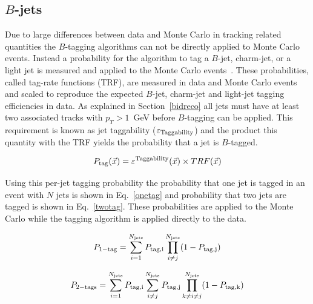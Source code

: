 \subsection{$B$-jets}

Due to large differences between data and Monte Carlo in tracking related quantities the $B$-tagging algorithms can not be directly applied to Monte Carlo events. Instead a probability for the algorithm to tag a $B$-jet, charm-jet, or a light jet is measured and applied to the Monte Carlo events~\cite{bid}. These probabilities, called tag-rate functions (TRF), are measured in data and Monte Carlo events and scaled to reproduce the expected $B$-jet, charm-jet and light-jet tagging efficiencies in data. As explained in Section~\ref{bidreco} all jets must have at least two associated tracks with $p_{T}>1$~GeV before $B$-tagging can be applied. This requirement is known as jet taggability ($\varepsilon_{\rm{Taggability}}$) and the product this quantity with the TRF yields the probability that a jet is $B$-tagged.

\begin{equation}
P_{\rm{tag}}(\vec{x}) = \varepsilon^{\rm{Taggability}}(\vec{x}) \times TRF(\vec{x})
\end{equation}

Using this per-jet tagging probability the probability that one jet is tagged in an event with $N$ jets is shown in Eq.~\ref{onetag} and probability that two jets are tagged is shown in Eq.~\ref{twotag}. These probabilities are applied to the Monte Carlo while the tagging algorithm is applied directly to the data.

\begin{equation}
\label{onetag}
P_{\rm{1-tag}} = \sum_{i=1}^{N_{\rm{jets}}} P_{\rm{tag},i} \prod_{i \neq j}^{N_{\rm{jets}}} ( 1 - P_{\rm{tag},j} )
\end{equation}

\begin{equation}
\label{twotag}
P_{\rm{2-tags}} = \sum_{i=1}^{N_{\rm{jets}}} P_{\rm{tag},i} \sum_{i \neq j}^{N_{\rm{jets}}} P_{\rm{tag},j} \prod_{k \neq i \neq j}^{N_{\rm{jets}}} ( 1 - P_{\rm{tag},k} )
\end{equation}

